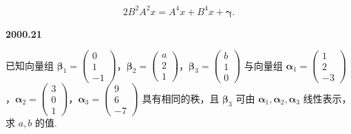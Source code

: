 \documentclass[UTF8,12pt,fontset=windows]{ctexart}
\begin{document}
$$2B^2 A^2 x = A^4 x + B^4 x + \boldsymbol{\gamma}.$$

\vfill
\newpage
{\large\bfseries 2000.21}

已知向量组 $\boldsymbol{\beta}_1 = \begin{pmatrix} 0 \\ 1 \\ -1 \end{pmatrix}$，$\boldsymbol{\beta}_2 = \begin{pmatrix} a \\ 2 \\ 1 \end{pmatrix}$，$\boldsymbol{\beta}_3 = \begin{pmatrix} b \\ 1 \\ 0 \end{pmatrix}$ 与向量组 $\boldsymbol{\alpha}_1 = \begin{pmatrix} 1 \\ 2 \\ -3 \end{pmatrix}$，$\boldsymbol{\alpha}_2 = \begin{pmatrix} 3 \\ 0 \\ 1 \end{pmatrix}$，$\boldsymbol{\alpha}_3 = \begin{pmatrix} 9 \\ 6 \\ -7 \end{pmatrix}$ 具有相同的秩，且 $\boldsymbol{\beta}_3$ 可由 $\boldsymbol{\alpha}_1,\boldsymbol{\alpha}_2,\boldsymbol{\alpha}_3$ 线性表示，求 $a,b$ 的值.

\vfill
\end{document}
